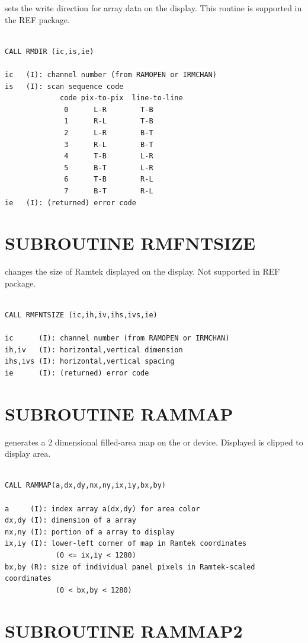 \documentclass[11pt]{report}
\begin{document}
 sets the write direction for  array data on the
 display.  This routine is supported in the REF package.
\begin{verbatim}

CALL RMDIR (ic,is,ie)

ic   (I): channel number (from RAMOPEN or IRMCHAN)
is   (I): scan sequence code
             code pix-to-pix  line-to-line
              0      L-R        T-B
              1      R-L        T-B
              2      L-R        B-T
              3      R-L        B-T
              4      T-B        L-R
              5      B-T        L-R
              6      T-B        R-L
              7      B-T        R-L
ie   (I): (returned) error code
\end{verbatim}

\section{SUBROUTINE RMFNTSIZE}

 changes the size of Ramtek  displayed on the  display.
Not supported in REF package.
\begin{verbatim}

CALL RMFNTSIZE (ic,ih,iv,ihs,ivs,ie)

ic      (I): channel number (from RAMOPEN or IRMCHAN)
ih,iv   (I): horizontal,vertical dimension
ihs,ivs (I): horizontal,vertical spacing
ie      (I): (returned) error code
\end{verbatim}

\section{SUBROUTINE RAMMAP}

 generates a 2 dimensional filled-area map on the  or
 device.  Displayed  is clipped to display area.
\begin{verbatim}

CALL RAMMAP(a,dx,dy,nx,ny,ix,iy,bx,by)

a     (I): index array a(dx,dy) for area color
dx,dy (I): dimension of a array
nx,ny (I): portion of a array to display
ix,iy (I): lower-left corner of map in Ramtek coordinates
            (0 <= ix,iy < 1280)
bx,by (R): size of individual panel pixels in Ramtek-scaled coordinates
            (0 < bx,by < 1280)
\end{verbatim}

\section{SUBROUTINE RAMMAP2}
\end{document}
